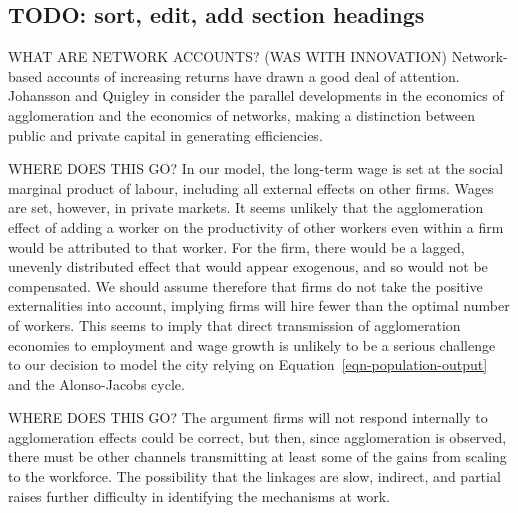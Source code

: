 \subsection{TODO: sort, edit, add section headings} %



WHAT ARE NETWORK ACCOUNTS? (WAS WITH INNOVATION) Network-based accounts of increasing returns have drawn a good deal of attention.
Johansson and Quigley \cite{johanssonAgglomerationNetworksSpatial} in \cite{floraxFiftyYearsRegional2004} consider the parallel developments in the economics of agglomeration and the economics of networks, making a distinction between public and private capital in generating efficiencies.

WHERE DOES THIS GO? In our model, the long-term wage is set at the social marginal product of labour, including all external effects on other firms. Wages are set, however, in private markets. It seems unlikely that the agglomeration effect of adding a worker on the productivity of other workers even within a firm would be attributed to that worker. For the firm, there would be a lagged, unevenly distributed effect that would appear exogenous, and so would not be compensated. 
We should assume therefore that firms do not take the positive externalities into account, implying firms will hire fewer than the optimal number of workers. 
This seems to imply that direct transmission of agglomeration economies to employment and wage growth is unlikely to be a serious challenge to our decision to model the city relying on Equation~\ref{eqn-population-output} and the  Alonso-Jacobs cycle.




WHERE DOES THIS GO? The argument firms will not respond internally to agglomeration effects could be correct, but then, since agglomeration is observed, there must be other channels transmitting at least some of the gains from scaling to the workforce. 
The possibility that the linkages are slow, indirect, and partial raises further difficulty in identifying the mechanisms at work.




